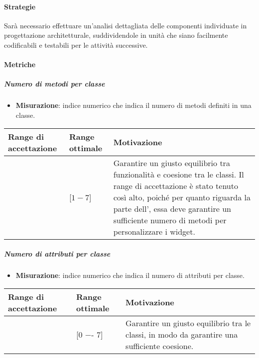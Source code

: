 \paragraph{Strategie}

Sarà necessario effettuare un'analisi dettagliata delle componenti individuate in progettazione architetturale, suddividendole in unità che siano facilmente codificabili e testabili per le attività successive.

\paragraph{Metriche}

\subparagraph{Numero di metodi per classe}

\begin{itemize}
\item \textbf{Misurazione}: indice numerico che indica il numero di metodi definiti in una classe.
\end{itemize}


\begin{center}
\begin{tabular}{|P{2.5cm}|P{2.5cm}|P{6cm}|}
		\hline
			\textbf{Range di accettazione}	& \textbf{Range ottimale} & \textbf{Motivazione} \\
			\hline
			[$1 - 15$] & [$1 - 7$] &	Garantire un giusto equilibrio tra funzionalità e coesione tra le classi. Il range di accettazione è stato tenuto così alto, poiché per quanto riguarda la parte dell', essa deve garantire un sufficiente numero di metodi per personalizzare i widget. \\
			\hline
			\end{tabular}
\end{center}

\subparagraph{Numero di attributi per classe}

\begin{itemize}
\item \textbf{Misurazione}: indice numerico che indica il numero di attributi per classe.
\end{itemize}

\begin{center}
		\begin{tabular}{|P{2.5cm}|P{2.5cm}|P{6cm}|}
		\hline
			\textbf{Range di accettazione}	& \textbf{Range ottimale} & \textbf{Motivazione} \\
			\hline
			[0 −- 11] & [0 −- 7] &	Garantire un giusto equilibrio tra le classi, in modo da garantire una sufficiente coesione. \\
			\hline
			\end{tabular}
\end{center}

